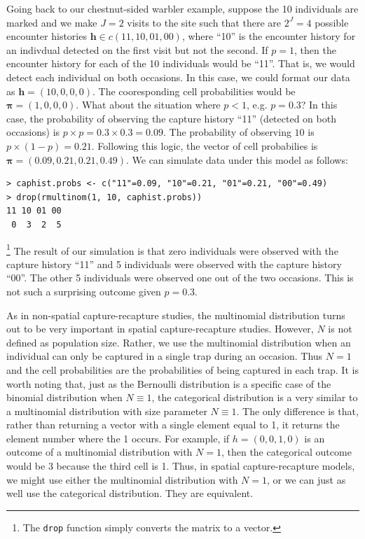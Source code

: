 Going back to our
chestnut-sided warbler example, suppose the 10 individuals are marked
and we make $J=2$ visits to the site such that there are $2^J = 4$ possible encounter
histories $\mathbf{h} \in c(11, 10, 01, 00)$, where ``10'' is the
encounter history for an indivdual detected on the first visit but not
the second. If $p=1$, then the
encounter history for each of the 10 individuals would be ``11''. That
is, we would detect each individual on both occasions. In this case,
we could format our data as $\mathbf{h} = (10, 0, 0, 0)$. The
cooresponding cell probabilities would be $\bm{\pi} = (1, 0, 0,
0)$. What about the situation where $p<1$, e.g. $p=0.3$? In this case, the
probability of observing the capture history ``11'' (detected on both
occasions) is $p \times p = 0.3 \times 0.3 = 0.09$. The probability of
observing $10$ is $p \times (1-p) = 0.21$. Following this logic, the vector
of cell probabilies is $\bm{\pi} = (0.09, 0.21, 0.21, 0.49)$. We can
simulate data under this model as follows:
\begin{verbatim}
> caphist.probs <- c("11"=0.09, "10"=0.21, "01"=0.21, "00"=0.49)
> drop(rmultinom(1, 10, caphist.probs))
11 10 01 00
 0  3  2  5
\end{verbatim}\footnote{The \verb+drop+ function simply converts the matrix to a vector.}
The
result of our simulation is that zero individuals were observed with
the capture history ``11'' and 5 individuals were observed with the
capture history ``00''. The other 5 individuals were observed one out
of the two occasions. This is not such a surprising outcome given
$p=0.3$.

As in non-spatial capture-recapture studies, the multinomial
distribution turns out to be very important in spatial
capture-recapture studies. However, $N$ is not defined as population
size. Rather, we use the multinomial distribution when an individual
can only be captured in a single trap during an occasion. Thus
$N=1$ and the cell probabilities are the probabilities of
being captured in each trap.
It is worth noting that, just as the Bernoulli distribution is a specific case of the binomial
distribution when $N \equiv 1$, the categorical distribution is a very
similar to a multinomial distribution with size parameter
$N\equiv1$. The only difference is that, rather than returning a
vector with a single element equal to 1, it returns the element number
where the 1 occurs. For example, if $h=(0,0,1,0)$ is an outcome of a
multinomial distribution with $N=1$, then the categorical outcome
would be 3 because the third cell is 1. Thus, in spatial
capture-recapture models, we might use either the multinomial
distribution with $N=1$, or we can just as well use the categorical
distribution. They are equivalent.



